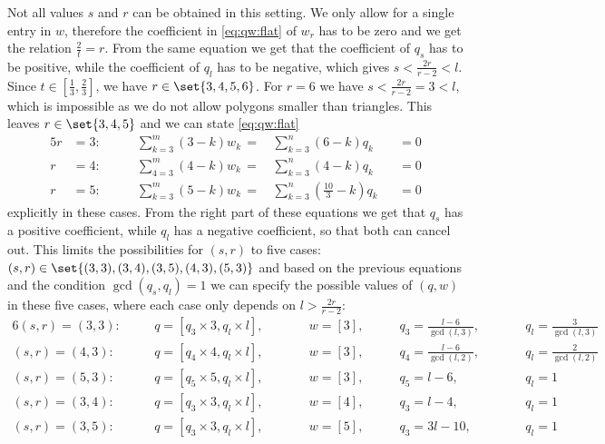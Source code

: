 Not all values $s$ and $r$ can be obtained in this setting. We only allow for a single entry in $w$, therefore the coefficient in \eqref{eq:qw:flat} of $w_r$ has to be zero and we get the relation $\frac{2}{t} = r$. From the same equation we get that the coefficient of $q_s$ has to be positive, while the coefficient of $q_l$ has to be negative, which gives $s < \frac{2r}{r - 2} < l$. Since $t \in \left[\frac{1}{3}, \frac{2}{3}\right]$, we have $r \in \set{3, 4, 5, 6}$. For $r = 6$ we have $s < \frac{2r}{r - 2} = 3 < l$, which is impossible as we do not allow polygons smaller than triangles. This leaves $r \in \set{3, 4, 5}$ and we can state \eqref{eq:qw:flat} 
\begin{alignat}{5}
  r &= 3: \qquad &  \sum_{k=3}^m \left(3 - k \right) w_k\,=\,&    \sum_{k=3}^n \left(6 - k \right) q_k &&= 0 \label{eq:flat:3}\\
  r &= 4: \qquad &  \sum_{4=3}^m \left(4 - k \right) w_k\,=\,&    \sum_{k=3}^n \left(4 - k \right) q_k &&= 0  \label{eq:flat:4}\\
  r &= 5: \qquad &  \sum_{k=3}^m \left(5 - k \right) w_k\,=\,&    \sum_{k=3}^n \left( \tfrac{10}{3} - k \right) q_k &&= 0 \label{eq:flat:5}
\end{alignat}
explicitly in these cases. From the right part of these equations we get that $q_s$ has a positive coefficient, while $q_l$ has a negative coefficient, so that both can cancel out. This limits the possibilities for $(s, r)$ to five cases: $(s, r) \in \set{(3, 3), (3, 4), (3, 5), (4, 3), (5, 3)}$ and based on the previous equations and the condition $\gcd(q_s, q_l) = 1$ we can specify the possible values of $(q, w)$ in these five cases, where each case only depends on $l > \frac{2r}{r - 2}$:
\begin{alignat*}{6}
  (s, r) = (3, 3): \quad && q = [q_3 \times 3, q_l \times l],\qquad&&w = [3],\qquad&q_3 = \tfrac{l - 6}{\gcd(l, 3)}, &\qquad&q_l = \tfrac{3}{\gcd(l, 3)} \\
  (s, r) = (4, 3): \quad && q = [q_4 \times 4, q_l \times l],\qquad&&w = [3],\qquad&q_4 = \tfrac{l - 6}{\gcd(l, 2)}, &\qquad&q_l = \tfrac{2}{\gcd(l, 2)} \\
  (s, r) = (5, 3): \quad && q = [q_5 \times 5, q_l \times l],\qquad&&w = [3],\qquad&q_5 = l - 6,                     &\qquad&q_l = 1 \\
  (s, r) = (3, 4): \quad && q = [q_3 \times 3, q_l \times l],\qquad&&w = [4],\qquad&q_3 = l - 4,                     &\qquad&q_l = 1 \\
  (s, r) = (3, 5): \quad && q = [q_3 \times 3, q_l \times l],\qquad&&w = [5],\qquad&q_3 = 3l - 10,                   &\qquad&q_l = 1
\end{alignat*}

